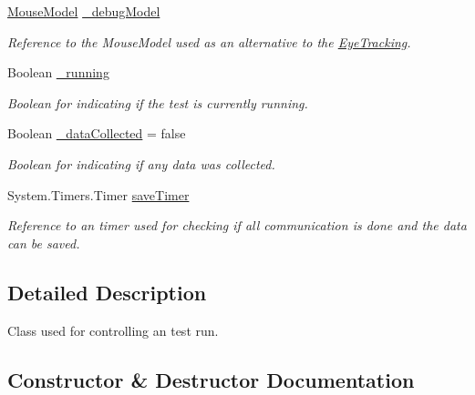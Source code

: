 \begin{DoxyCompactItemize}
\hyperlink{class_web_analyzer_1_1_test_1_1_communication_1_1_mouse_model}{Mouse\+Model} \hyperlink{class_web_analyzer_1_1_controller_1_1_test_controller_a1c615e40201210940f07312bcc993ef5}{\+\_\+debug\+Model}
\begin{DoxyCompactList}\small\item\em Reference to the Mouse\+Model used as an alternative to the \hyperlink{namespace_web_analyzer_1_1_eye_tracking}{Eye\+Tracking}. \end{DoxyCompactList}\item 
Boolean \hyperlink{class_web_analyzer_1_1_controller_1_1_test_controller_a49aaaa975ccbeedcd52fb03288cea3ef}{\+\_\+running}
\begin{DoxyCompactList}\small\item\em Boolean for indicating if the test is currently running. \end{DoxyCompactList}\item 
Boolean \hyperlink{class_web_analyzer_1_1_controller_1_1_test_controller_a7d63bbfba4672d52414c318b397c504b}{\+\_\+data\+Collected} = false
\begin{DoxyCompactList}\small\item\em Boolean for indicating if any data was collected. \end{DoxyCompactList}\item 
System.\+Timers.\+Timer \hyperlink{class_web_analyzer_1_1_controller_1_1_test_controller_a484747e48ceb23e931111018ed87d8e1}{save\+Timer}
\begin{DoxyCompactList}\small\item\em Reference to an timer used for checking if all communication is done and the data can be saved. \end{DoxyCompactList}\end{DoxyCompactItemize}


\subsection{Detailed Description}
Class used for controlling an test run. 



\subsection{Constructor \& Destructor Documentation}
\hypertarget{class_web_analyzer_1_1_controller_1_1_test_controller_acac996dad8f9c1f9890263f82df9593a}{}
